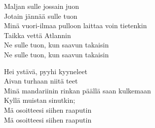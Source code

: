 Maljan sulle jossain juon\\
Jotain jännää sulle tuon\\
Minä vuori-ilmaa pulloon laittaa voin tietenkin\\
Taikka vettä Atlannin\\
Ne sulle tuon, kun saavun takaisin\\
Ne sulle tuon, kun saavun takaisin

Hei ystävä, pyyhi kyyneleet\\
Aivan turhaan niitä teet\\
Minä mandariinin rinkan päällä saan kulkemaan\\
Kyllä muistan sinutkin;\\
Mä osoitteesi siihen raaputin\\
Mä osoitteesi siihen raaputin